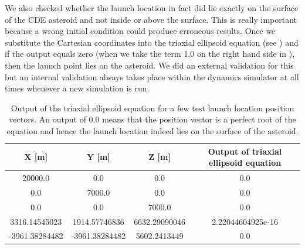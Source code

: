 \FloatBarrier
We also checked whether the launch location in fact did lie exactly on the surface of the \gls{CDE} asteroid and not inside or above the surface. This is really important because a wrong initial condition could produce erroneous results. Once we substitute the Cartesian coordinates into the triaxial ellipsoid equation (see ) and if the output equals zero (when we take the term 1.0 on the right hand side in ), then the launch point lies on the asteroid. We did an external validation for this but an internal validation always takes place within the dynamics simulator at all times whenever a new simulation is run.
\begin{table}[htb]
\centering
\captionsetup{justification=centering}
\caption{Output of the triaxial ellipsoid equation for a few test launch location position vectors. An output of 0.0 means that the position vector is a perfect root of the equation and hence the launch location indeed lies on the surface of the asteroid.}
\label{tab:launch_location_surface_vv}
\begin{tabular}{|c|c|c|c|}
\hline
\textbf{X {[}m{]}} & \textbf{Y {[}m{]}} & \textbf{Z {[}m{]}} & \textbf{Output of triaxial ellipsoid equation} \\ \hline
20000.0 & 0.0 & 0.0 & 0.0 \\ \hline
0.0 & 7000.0 & 0.0 & 0.0 \\ \hline
0.0 & 0.0 & 7000.0 & 0.0 \\ \hline
3316.14545023 & 1914.57746836 & 6632.29090046 & 2.22044604925e-16 \\ \hline
-3961.38284482 & -3961.38284482 & 5602.2413449 & 0.0 \\ \hline
\end{tabular}
\end{table}
\FloatBarrier

